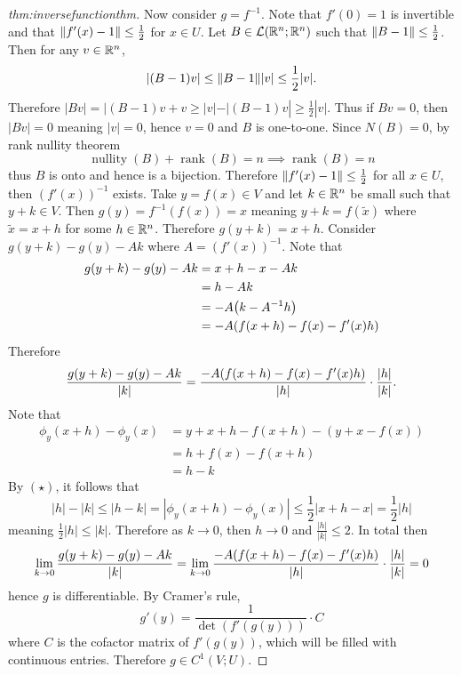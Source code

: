 \documentclass[../main.tex]{subfiles}
\begin{document}
\begin{proof}[thm:inversefunctionthm]
    Now consider $g = f^{-1}$. Note that $f'(0) = 1$ is invertible and that $\norm{f'(x) - 1} \leq \frac{1}{2}$ for $x \in U$. Let $B \in \mathcal{L}(\mathbb{R}^n; \mathbb{R}^n)$ such that $\norm{B - 1} \leq \frac{1}{2}$. Then for any $v \in \mathbb{R}^n$,
    \[
        |(B-1)v| \leq \norm{B - 1} |v| \leq \frac{1}{2} |v|
    .\]
    Therefore $|Bv| = |(B-1)v + v \geq |v| - |(B-1)v| \geq \frac{1}{2} |v|$. Thus if  $Bv = 0$, then $|Bv| = 0$ meaning $|v| = 0$, hence $v = 0$ and $B$ is one-to-one. Since $N(B) = \qty{0}$, by rank nullity theorem
    \[
        \operatorname{nullity}(B) + \operatorname{rank}(B) = n \implies \operatorname{rank}(B) = n
    \]
    thus $B$ is onto and hence is a bijection. Therefore $\norm{f'(x) - 1} \leq \frac{1}{2}$ for all $x\in U$, then $(f'(x))^{-1}$ exists. Take $y = f(x) \in V$ and let $k \in \mathbb{R}^n$ be small such that $y + k \in V$. Then $g(y) = f^{-1}(f(x)) = x$ meaning $y + k = f(\tilde{x})$ where $\tilde{x} = x + h$ for some $h \in \mathbb{R}^n$. Therefore $g(y+k) = x + h$. Consider $g(y+k) - g(y) - A k$ where $A = (f'(x))^{-1}$. Note that
    \begin{align*}
        g(y+k) - g(y) - A k &= x + h - x - A k  \\
        &= h - A k \\
        &= -A \qty( k - A^{-1} h ) \\
        &= -A \qty( f(x+h) - f(x) - f'(x) h )
    \end{align*}
    Therefore
    \[
        \frac{g(y+k) - g(y) - Ak}{|k|} = \frac{-A \qty(f(x+h) - f(x) - f'(x) h)}{|h|} \cdot \frac{|h|}{|k|}
    .\]
    Note that
    \begin{align*}
        \phi_y(x + h) - \phi_y(x) &= y + x + h - f(x + h) - (y + x - f(x)) \\
        &= h + f(x) - f(x+h) \\ 
        &= h - k
    \end{align*}
    By $(\star)$, it follows that
    \[
        |h| - |k| \leq |h-k| = |\phi_y(x + h) - \phi_y(x)| \leq \frac{1}{2} |x + h - x| = \frac{1}{2} |h|
    \]
    meaning $\frac{1}{2} |h| \leq |k|$. Therefore as $k \to 0$, then $h \to 0$ and $\frac{|h|}{|k|} \leq 2$. In total then
    \[
        \lim_{k \to 0} \frac{g(y+k) - g(y) - Ak}{|k|} = \lim_{k \to 0} \frac{-A\qty(f(x+h) - f(x) - f'(x)h)}{|h|} \cdot \frac{|h|}{|k|} = 0
    \]
    hence $g$ is differentiable. By Cramer's rule,
    \[
        g'(y) = \frac{1}{\det(f'(g(y)))} \cdot C
    \]
    where $C$ is the cofactor matrix of $f'(g(y))$, which will be filled with continuous entries. Therefore $g \in C^1(V; U)$.
\end{proof}
\end{document}
